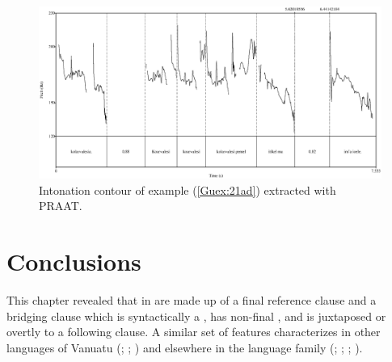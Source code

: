 \documentclass[output=paper]{LSP/langsci}
\begin{document}
\begin{figure}[ht]
\includegraphics[width=\textwidth]{figures/guerinFig8.eps}
\caption{Intonation contour of example (\ref{Guex:21ad}) extracted with PRAAT. \label{GuF8}}
\end{figure}




\section{Conclusions}
\label{Guconclu}
This chapter  revealed that  in  are made up of a final reference clause and a bridging clause which is syntactically a , has non-final , and is juxtaposed or overtly  to a following clause. A similar set of features characterizes  in other languages of Vanuatu (\citealt[][24--26]{Schneider09}; \citealt[][327]{Thieberger06}; \citealt[][426]{hyslop01}) and elsewhere in the  language family (\citealt{palmer09,Frostad2012}; \citealt[][172]{hamel88}; \citealt[][115--116]{Schokkin14}; \citealt[][94]{Lithgow95}). 
\end{document}
